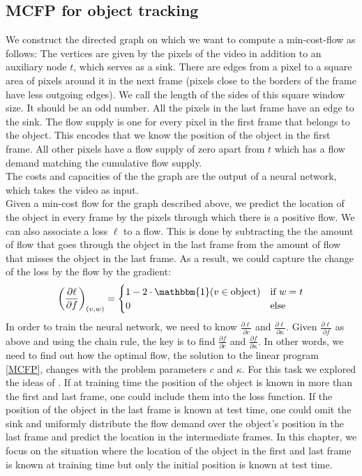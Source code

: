 \documentclass{article}
\begin{document}
\subsection{MCFP for object tracking}\label{MCFP for tracking}
We construct the directed graph on which we want to compute a min-cost-flow as follows: The vertices are given by the pixels of the video in addition to an auxiliary node $t$, which serves as a sink. There are edges from a pixel to a square area of pixels around it in the next frame (pixels close to the borders of the frame have less outgoing edges). We call the length of the sides of this square window size. It should be an odd number. All the pixels in the last frame have an edge to the sink. The flow supply is one for every pixel in the first frame that belongs to the object. This encodes that we know the position of the object in the first frame. All other pixels have a flow supply of zero apart from $t$ which has a flow demand matching the cumulative flow supply.\\
The costs and capacities of the the graph are the output of a neural network, which takes the video as input. \\
Given a min-cost flow for the graph described above, we predict the location of the object in every frame by the pixels through which there is a positive flow. We can also associate a loss $\ell$ to a flow. This is done by subtracting the the amount of flow that goes through the object in the last frame from the amount of flow that misses the object in the last frame. As a result, we could capture the change of the loss by the flow by the gradient:
\begin{align}\label{loss}
\left(\frac{\partial \ell}{\partial f}\right)_{(v,w)} = 
\begin{cases}
 1-2\cdot\mathbbm{1}( v\in\textnormal{object}) &\text{if } w = t\\
 0 &\text{else}
\end{cases}
\end{align}
In order to train the neural network, we need to know $\frac{\partial \ell}{\partial c}$ and $\frac{\partial \ell}{\partial\kappa}$. Given $\frac{\partial \ell}{\partial f}$ as above and using the chain rule, the key is to find $\frac{\partial f}{\partial c}$ and $\frac{\partial f}{\partial \kappa}$. In other words, we need to find out how the optimal flow, the solution to the linear program \eqref{MCFP}, changes with the problem parameters $c$ and $\kappa$. For this task we explored the ideas of \cite{AmosK17}. If at training time the position of the object is known in more than the first and last frame, one could include them into the loss function. If the position of the object in the last frame is known at test time, one could omit the sink and uniformly distribute the flow demand over the object's position in the last frame and predict the location in the intermediate frames.  In this chapter, we focus on the situation where the location of the object in the first and last frame is known at training time but only the initial position is known at test time.
\end{document}
